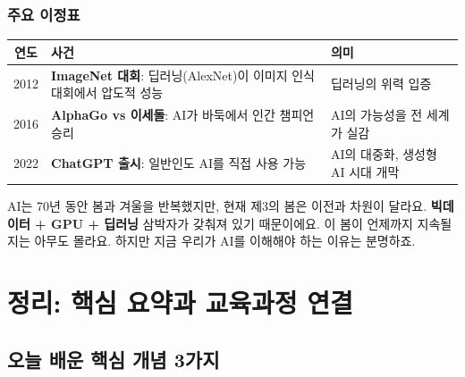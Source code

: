 \documentclass[11pt,a4paper]{article}
\begin{document}
\subsubsection{주요 이정표}

\begin{center}
\begin{tabular}{|c|p{6cm}|p{4.5cm}|}
\hline
\rowcolor{tableheader}
\textbf{연도} & \textbf{사건} & \textbf{의미} \\
\hline
2012 & \textbf{ImageNet 대회}: 딥러닝(AlexNet)이 이미지 인식 대회에서 압도적 성능 & 딥러닝의 위력 입증 \\
\hline
2016 & \textbf{AlphaGo vs 이세돌}: AI가 바둑에서 인간 챔피언 승리 & AI의 가능성을 전 세계가 실감 \\
\hline
2022 & \textbf{ChatGPT 출시}: 일반인도 AI를 직접 사용 가능 & AI의 대중화, 생성형 AI 시대 개막 \\
\hline
\end{tabular}
\end{center}

\begin{keybox}
AI는 70년 동안 봄과 겨울을 반복했지만, 현재 제3의 봄은 이전과 차원이 달라요. \textbf{빅데이터 + GPU + 딥러닝} 삼박자가 갖춰져 있기 때문이에요. 이 봄이 언제까지 지속될지는 아무도 몰라요. 하지만 지금 우리가 AI를 이해해야 하는 이유는 분명하죠.
\end{keybox}

\section{ 정리: 핵심 요약과 교육과정 연결}

\subsection{오늘 배운 핵심 개념 3가지}
\end{document}

